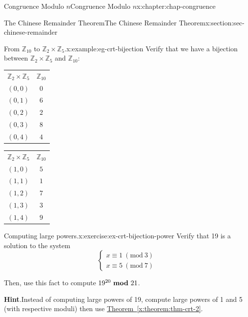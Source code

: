 \documentclass[oneside,10pt,]{book}
\newcommand{\blocktitlefont}{\relax}
\newcommand{\tabularfont}{\relax}
\newcommand{\xreffont}{\relax}
\numberwithin{equation}{section}
\newcommand{\Mod}[1]{\ \left(\mathrm{mod}\ #1\right)}
\newcommand{\mmod}[1]{\ \mathrm{\bf mod}\ #1}
\begin{document}
\begin{chapterptx}{Congruence Modulo \(n\)}{}{Congruence Modulo \(n\)}{}{}{x:chapter:chap-congruence}
\begin{sectionptx}{The Chinese Remainder Theorem}{}{The Chinese Remainder Theorem}{}{}{x:section:sec-chinese-remainder}
\begin{example}{From \(\mathbb{Z}_{10}\) to \(\mathbb{Z}_2 \times \mathbb{Z}_5\).}{x:example:eg-crt-bijection}
Verify that we have a bijection between \(\mathbb{Z}_2 \times \mathbb{Z}_5\) and \(\mathbb{Z}_{10}\):%
\begin{sidebyside}{2}{0.15}{0.15}{0.1}%
\begin{sbspanel}{0.3}%
{\centering%
{\tabularfont%
\begin{tabular}{ll}
\multicolumn{1}{c}{\(\mathbb{Z}_2 \times \mathbb{Z}_5\)}&\multicolumn{1}{c}{\(\mathbb{Z}_{10}\)}\tabularnewline[0pt]
\multicolumn{1}{c}{\((0,0)\)}&\multicolumn{1}{c}{\(0\)}\tabularnewline[0pt]
\multicolumn{1}{c}{\((0,1)\)}&\multicolumn{1}{c}{\(6\)}\tabularnewline[0pt]
\multicolumn{1}{c}{\((0,2)\)}&\multicolumn{1}{c}{\(2\)}\tabularnewline[0pt]
\multicolumn{1}{c}{\((0,3)\)}&\multicolumn{1}{c}{\(8\)}\tabularnewline[0pt]
\multicolumn{1}{c}{\((0,4)\)}&\multicolumn{1}{c}{\(4\)}
\end{tabular}
}%
\par}
\end{sbspanel}%
\begin{sbspanel}{0.3}%
{\centering%
{\tabularfont%
\begin{tabular}{ll}
\multicolumn{1}{c}{\(\mathbb{Z}_2 \times \mathbb{Z}_5\)}&\multicolumn{1}{c}{\(\mathbb{Z}_{10}\)}\tabularnewline[0pt]
\multicolumn{1}{c}{\((1,0)\)}&\multicolumn{1}{c}{\(5\)}\tabularnewline[0pt]
\multicolumn{1}{c}{\((1,1)\)}&\multicolumn{1}{c}{\(1\)}\tabularnewline[0pt]
\multicolumn{1}{c}{\((1,2)\)}&\multicolumn{1}{c}{\(7\)}\tabularnewline[0pt]
\multicolumn{1}{c}{\((1,3)\)}&\multicolumn{1}{c}{\(3\)}\tabularnewline[0pt]
\multicolumn{1}{c}{\((1,4)\)}&\multicolumn{1}{c}{\(9\)}
\end{tabular}
}%
\par}
\end{sbspanel}%
\end{sidebyside}%
\end{example}
\begin{inlineexercise}{Computing large powers.}{x:exercise:ex-crt-bijection-power}%
Verify that 19 is a solution to the system%
\begin{equation*}
\begin{cases} x \equiv 1 \Mod{3} \\ x \equiv 5 \Mod{7}\end{cases}
\end{equation*}
%
\par
Then, use this fact to compute \(19^{20} \mmod{21}\).%
\par\smallskip%
\noindent\textbf{\blocktitlefont Hint}.\hypertarget{g:hint:id265925}{}\quad{}Instead of computing large powers of 19, compute large powers of 1 and 5 (with respective moduli) then use \hyperref[x:theorem:thm-crt-2]{Theorem~{\xreffont\ref{x:theorem:thm-crt-2}}}.%

\end{inlineexercise}
\end{sectionptx}
\end{chapterptx}
\end{document}
